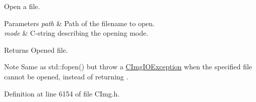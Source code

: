 Open a file. 


\begin{DoxyParams}{Parameters}
{\em path} & Path of the filename to open. \\
\hline
{\em mode} & C-\/string describing the opening mode. \\
\hline
\end{DoxyParams}
\begin{DoxyReturn}{Returns}
Opened file. 
\end{DoxyReturn}
\begin{DoxyNote}{Note}
Same as {\ttfamily std\+::fopen()} but throw a {\ttfamily \hyperlink{structcimg__library__suffixed_1_1CImgIOException}{C\+Img\+I\+O\+Exception}} when the specified file cannot be opened, instead of returning {}. 
\end{DoxyNote}


Definition at line 6154 of file C\+Img.\+h.



